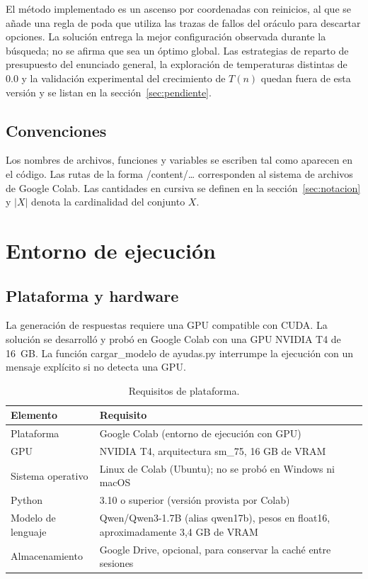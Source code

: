 \documentclass[12pt,letterpaper]{article}
\theoremstyle{definition}
\begin{document}
El método implementado es un ascenso por coordenadas con reinicios, al que se añade una regla de poda que utiliza las trazas de fallos del oráculo para descartar opciones. La solución entrega la mejor configuración observada durante la búsqueda; no se afirma que sea un óptimo global. Las estrategias de reparto de presupuesto del enunciado general, la exploración de temperaturas distintas de 0.0 y la validación experimental del crecimiento de $T(n)$ quedan fuera de esta versión y se listan en la sección~\ref{sec:pendiente}.

\subsection{Convenciones}
Los nombres de archivos, funciones y variables se escriben tal como aparecen en el código. Las rutas de la forma /content/\dots{} corresponden al sistema de archivos de Google Colab. Las cantidades en cursiva se definen en la sección~\ref{sec:notacion} y $|X|$ denota la cardinalidad del conjunto $X$.

\section{Entorno de ejecución}

\subsection{Plataforma y hardware}
La generación de respuestas requiere una GPU compatible con CUDA. La solución se desarrolló y probó en Google Colab con una GPU NVIDIA T4 de 16~GB. La función cargar\_modelo de ayudas.py interrumpe la ejecución con un mensaje explícito si no detecta una GPU.

\begin{table}[H]
\caption{Requisitos de plataforma.}
\begin{tabularx}{\textwidth}{@{}p{4cm}L@{}}
\toprule
Elemento & Requisito \\
\midrule
Plataforma & Google Colab (entorno de ejecución con GPU) \\
GPU & NVIDIA T4, arquitectura sm\_75, 16 GB de VRAM \\
Sistema operativo & Linux de Colab (Ubuntu); no se probó en Windows ni macOS \\
Python & 3.10 o superior (versión provista por Colab) \\
Modelo de lenguaje & Qwen/Qwen3-1.7B (alias qwen17b), pesos en float16, aproximadamente 3,4 GB de VRAM \\
Almacenamiento & Google Drive, opcional, para conservar la caché entre sesiones \\
\bottomrule
\end{tabularx}
\end{table}
\end{document}
